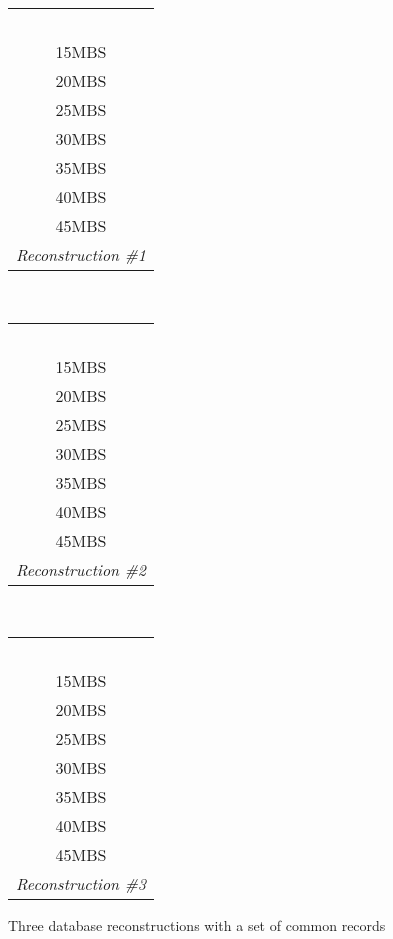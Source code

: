 \documentclass{article}
\newcommand{\tablewidth}{1in}
\begin{document}
\begin{figure}
  \begin{tabular}{|c|}
    \hline
    ~\hspace{\tablewidth}~\\[-8pt]
        15MBS \\
        20MBS \\
        25MBS \\
        30MBS \\
        35MBS \\
        40MBS \\
        45MBS \\
        \hline
  \multicolumn{1}{p{\tablewidth}}{\textit{\small Reconstruction \#1}}
  \end{tabular}
  ~
  \begin{tabular}{|c|}
    \hline
    ~\hspace{\tablewidth}~\\[-8pt]
        15MBS \\
        20MBS \\
        25MBS \\
        30MBS \\
        35MBS \\
        40MBS \\
        45MBS \\
        \hline
  \multicolumn{1}{p{\tablewidth}}{\textit{\small Reconstruction \#2}}
  \end{tabular}
  ~
  \begin{tabular}{|c|}
    \hline
    ~\hspace{\tablewidth}~\\[-8pt]
        15MBS \\
        20MBS \\
        25MBS \\
        30MBS \\
        35MBS \\
        40MBS \\
        45MBS \\
        \hline
  \multicolumn{1}{p{\tablewidth}}{\textit{\small Reconstruction \#3}}
  \end{tabular}

  \caption{Three database reconstructions with a set of common records}
\end{figure}
\end{document}
